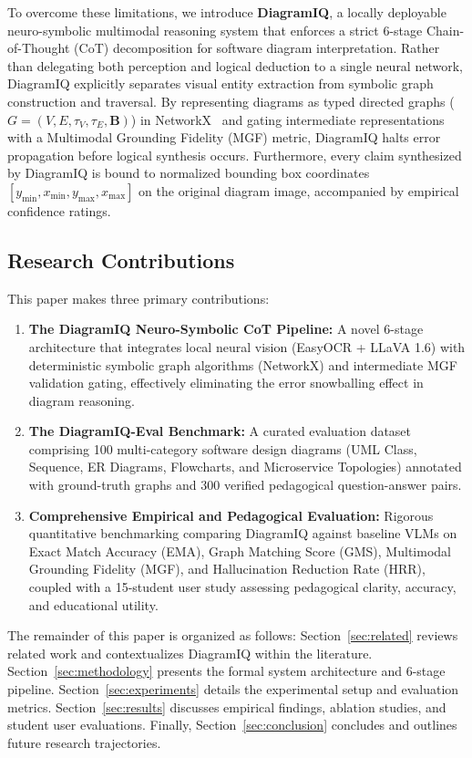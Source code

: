 \documentclass[runningheads]{llncs}
\begin{document}
To overcome these limitations, we introduce \textbf{DiagramIQ}, a locally deployable neuro-symbolic multimodal reasoning system that enforces a strict 6-stage Chain-of-Thought (CoT) decomposition for software diagram interpretation. Rather than delegating both perception and logical deduction to a single neural network, DiagramIQ explicitly separates visual entity extraction from symbolic graph construction and traversal. By representing diagrams as typed directed graphs ($G = (V, E, \tau_V, \tau_E, \mathbf{B})$) in NetworkX~\cite{hagberg2008exploring} and gating intermediate representations with a Multimodal Grounding Fidelity (MGF) metric, DiagramIQ halts error propagation before logical synthesis occurs. Furthermore, every claim synthesized by DiagramIQ is bound to normalized bounding box coordinates $[y_{\min}, x_{\min}, y_{\max}, x_{\max}]$ on the original diagram image, accompanied by empirical confidence ratings.

\subsection{Research Contributions}
This paper makes three primary contributions:
\begin{enumerate}
    \item \textbf{The DiagramIQ Neuro-Symbolic CoT Pipeline:} A novel 6-stage architecture that integrates local neural vision (EasyOCR + LLaVA 1.6) with deterministic symbolic graph algorithms (NetworkX) and intermediate MGF validation gating, effectively eliminating the error snowballing effect in diagram reasoning.
    \item \textbf{The DiagramIQ-Eval Benchmark:} A curated evaluation dataset comprising 100 multi-category software design diagrams (UML Class, Sequence, ER Diagrams, Flowcharts, and Microservice Topologies) annotated with ground-truth graphs and 300 verified pedagogical question-answer pairs.
    \item \textbf{Comprehensive Empirical and Pedagogical Evaluation:} Rigorous quantitative benchmarking comparing DiagramIQ against baseline VLMs on Exact Match Accuracy (EMA), Graph Matching Score (GMS), Multimodal Grounding Fidelity (MGF), and Hallucination Reduction Rate (HRR), coupled with a 15-student user study assessing pedagogical clarity, accuracy, and educational utility.
\end{enumerate}

The remainder of this paper is organized as follows: Section~\ref{sec:related} reviews related work and contextualizes DiagramIQ within the literature. Section~\ref{sec:methodology} presents the formal system architecture and 6-stage pipeline. Section~\ref{sec:experiments} details the experimental setup and evaluation metrics. Section~\ref{sec:results} discusses empirical findings, ablation studies, and student user evaluations. Finally, Section~\ref{sec:conclusion} concludes and outlines future research trajectories.
\end{document}
